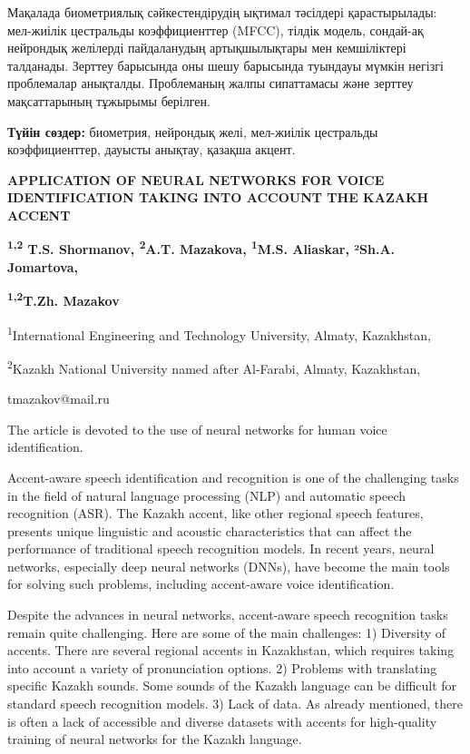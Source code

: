 Мақалада биометриялық сәйкестендірудің ықтимал тәсілдері қарастырылады:
мел-жиілік цестральды коэффициенттер (MFCC), тілдік модель, сондай-ақ
нейрондық желілерді пайдаланудың артықшылықтары мен кемшіліктері
талданады. Зерттеу барысында оны шешу барысында туындауы мүмкін негізгі
проблемалар анықталды. Проблеманың жалпы сипаттамасы және зерттеу
мақсаттарының тұжырымы берілген.

{\bfseries Түйін сөздер:} биометрия, нейрондық желі, мел-жиілік цестральды
коэффициенттер, дауысты анықтау, қазақша акцент.

\begin{articleheader}
{\bfseries APPLICATION OF NEURAL NETWORKS FOR VOICE IDENTIFICATION TAKING
INTO ACCOUNT THE KAZAKH ACCENT}

{\bfseries \textsuperscript{1,2} T.S. Shormanov, \textsuperscript{2}A.T.
Mazakova, \textsuperscript{1}M.S. Aliaskar, ²Sh.A. Jomartova,}

{\bfseries \textsuperscript{1,2}T.Zh. Mazakov\textsuperscript{\envelope }}
\end{articleheader}

\begin{affiliation}
\textsuperscript{1}International Engineering and Technology University,
Almaty, Kazakhstan,

\textsuperscript{2}Kazakh National University named after Al-Farabi,
Almaty, Kazakhstan,

tmazakov@mail.ru
\end{affiliation}

The article is devoted to the use of neural networks for human voice
identification.

Accent-aware speech identification and recognition is one of the
challenging tasks in the field of natural language processing (NLP) and
automatic speech recognition (ASR). The Kazakh accent, like other
regional speech features, presents unique linguistic and acoustic
characteristics that can affect the performance of traditional speech
recognition models. In recent years, neural networks, especially deep
neural networks (DNNs), have become the main tools for solving such
problems, including accent-aware voice identification.

Despite the advances in neural networks, accent-aware speech recognition
tasks remain quite challenging. Here are some of the main challenges: 1)
Diversity of accents. There are several regional accents in Kazakhstan,
which requires taking into account a variety of pronunciation options.
2) Problems with translating specific Kazakh sounds. Some sounds of the
Kazakh language can be difficult for standard speech recognition models.
3) Lack of data. As already mentioned, there is often a lack of
accessible and diverse datasets with accents for high-quality training
of neural networks for the Kazakh language.


